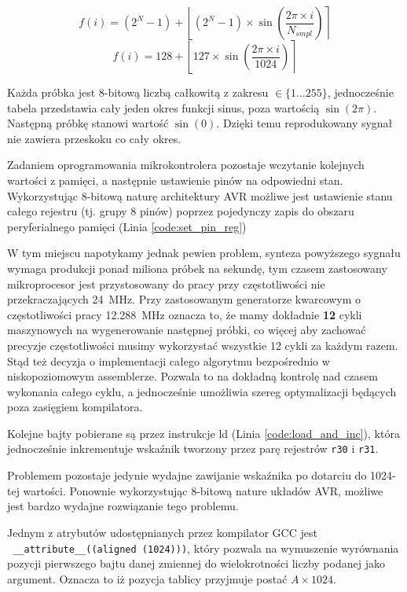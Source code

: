 \documentclass[12pt, a4paper]{article}
\begin{document}
\begin{equation}
	f(i) = (2^N - 1) + \left\lfloor (2^N - 1) \times \sin \left(\frac{2 \pi \times i}{N_{smpl}}\right)\right\rceil
\end{equation}
\begin{equation}
	f(i) = 128 + \left\lfloor 127 \times \sin \left(\frac{2 \pi \times i}{1024}\right)\right\rceil
\end{equation}

Każda próbka jest 8-bitową liczbą całkowitą z zakresu $\in \{1 \dots 255\}$, jednocześnie tabela przedstawia cały jeden okres funkcji sinus,
poza wartością $\sin (2 \pi)$. Następną próbkę stanowi wartość $\sin (0)$. Dzięki temu reprodukowany sygnał nie zawiera przeskoku co cały okres.

Zadaniem oprogramowania mikrokontrolera pozostaje wczytanie kolejnych wartości z pamięci,
a następnie ustawienie pinów na odpowiedni stan. Wykorzystując 8-bitową naturę architektury AVR
możliwe jest ustawienie stanu całego rejestru (tj. grupy 8 pinów) poprzez pojedynczy zapis do 
obszaru peryferialnego pamięci (Linia \ref{code:set_pin_reg})

W tym miejscu napotykamy jednak pewien problem, synteza powyższego sygnału wymaga produkcji ponad miliona próbek na sekundę,
tym czasem zastosowany mikroprocesor jest przystosowany do pracy przy częstotliwości nie przekraczających \qty{24}{\MHz}.
Przy zastosowanym generatorze kwarcowym o częstotliwości pracy \qty{12,288}{\MHz} oznacza to, że mamy dokładnie \textbf{12} cykli maszynowych
na wygenerowanie następnej próbki, co więcej aby zachować precyzje częstotliwości musimy wykorzystać wszystkie 12 cykli za każdym razem.
Stąd też decyzja o implementacji całego algorytmu bezpośrednio w niskopoziomowym assemblerze.
Pozwala to na dokładną kontrolę nad czasem wykonania całego cyklu, a jednocześnie umożliwia szereg optymalizacji
będących poza zasięgiem kompilatora.

Kolejne bajty pobierane są przez instrukcje ld (Linia \ref{code:load_and_inc}), która jednocześnie
inkrementuje wskaźnik tworzony przez parę rejestrów \verb|r30| i \verb|r31|.

Problemem pozostaje jedynie wydajne zawijanie wskaźnika po dotarciu do 1024-tej wartości.
Ponownie wykorzystując 8-bitową nature układów AVR, możliwe jest bardzo wydajne rozwiązanie tego problemu.

Jednym z atrybutów udostępnianych przez kompilator GCC jest\\
\verb| __attribute__((aligned (1024)))|, który pozwala na wymuszenie
wyrównania pozycji pierwszego bajtu danej zmiennej do wielokrotności liczby podanej jako argument.
Oznacza to iż pozycja tablicy przyjmuje postać $A \times 1024$.
\end{document}
